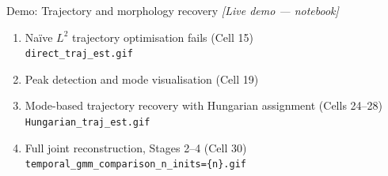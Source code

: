 \documentclass{beamer}
\begin{document}
    \begin{frame}{Demo: Trajectory and morphology recovery}
        \centering
        {\Large \textit{[Live demo --- notebook]}}

        \vspace{1em}
        \begin{enumerate}
            \item Na\"ive $L^2$ trajectory optimisation fails (Cell 15) \\
                  \small{\texttt{direct\_traj\_est.gif}}\normalsize
            \vspace{0.3em}
            \item Peak detection and mode visualisation (Cell 19)
            \vspace{0.3em}
            \item Mode-based trajectory recovery with Hungarian assignment (Cells 24--28) \\
                  \small{\texttt{Hungarian\_traj\_est.gif}}\normalsize
            \vspace{0.3em}
            \item Full joint reconstruction, Stages 2--4 (Cell 30) \\
                  \small{\texttt{temporal\_gmm\_comparison\_n\_inits=\{n\}.gif}}\normalsize
        \end{enumerate}

    \end{frame}
\end{document}
